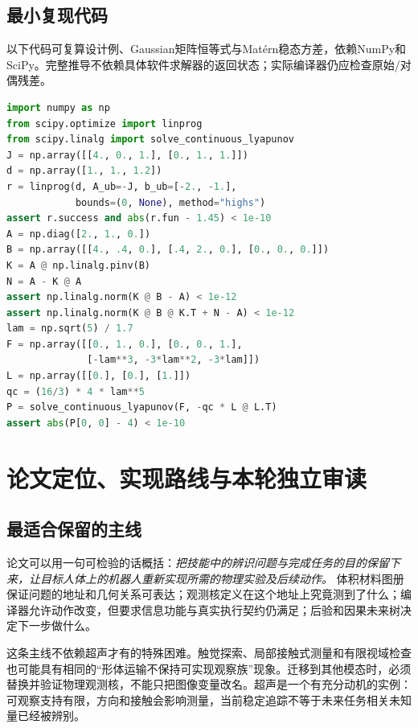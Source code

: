 \documentclass[11pt,a4paper]{article}
\numberwithin{equation}{section}
\theoremstyle{definition}
\begin{document}
\subsection{最小复现代码}
以下代码可复算设计例、Gaussian矩阵恒等式与Mat\'ern稳态方差，依赖NumPy和SciPy。完整推导不依赖具体软件求解器的返回状态；实际编译器仍应检查原始/对偶残差。
\begin{minipage}{\linewidth}
\begin{lstlisting}[language=Python,basicstyle=\ttfamily\footnotesize]
import numpy as np
from scipy.optimize import linprog
from scipy.linalg import solve_continuous_lyapunov
J = np.array([[4., 0., 1.], [0., 1., 1.]])
d = np.array([1., 1., 1.2])
r = linprog(d, A_ub=-J, b_ub=[-2., -1.],
            bounds=(0, None), method="highs")
assert r.success and abs(r.fun - 1.45) < 1e-10
A = np.diag([2., 1., 0.])
B = np.array([[4., .4, 0.], [.4, 2., 0.], [0., 0., 0.]])
K = A @ np.linalg.pinv(B)
N = A - K @ A
assert np.linalg.norm(K @ B - A) < 1e-12
assert np.linalg.norm(K @ B @ K.T + N - A) < 1e-12
lam = np.sqrt(5) / 1.7
F = np.array([[0., 1., 0.], [0., 0., 1.],
              [-lam**3, -3*lam**2, -3*lam]])
L = np.array([[0.], [0.], [1.]])
qc = (16/3) * 4 * lam**5
P = solve_continuous_lyapunov(F, -qc * L @ L.T)
assert abs(P[0, 0] - 4) < 1e-10
\end{lstlisting}
\end{minipage}


\section{论文定位、实现路线与本轮独立审读}
\label{last:assessment}

\subsection{最适合保留的主线}
论文可以用一句可检验的话概括：\emph{把技能中的辨识问题与完成任务的目的保留下来，让目标人体上的机器人重新实现所需的物理实验及后续动作。} 体积材料图册保证问题的地址和几何关系可表达；观测核定义在这个地址上究竟测到了什么；编译器允许动作改变，但要求信息功能与真实执行契约仍满足；后验和因果未来树决定下一步做什么。

这条主线不依赖超声才有的特殊困难。触觉探索、局部接触式测量和有限视域检查也可能具有相同的“形体运输不保持可实现观察族”现象。迁移到其他模态时，必须替换并验证物理观测核，不能只把图像变量改名。超声是一个有充分动机的实例：可观察支持有限，方向和接触会影响测量，当前稳定追踪不等于未来任务相关未知量已经被辨别。
\end{document}
